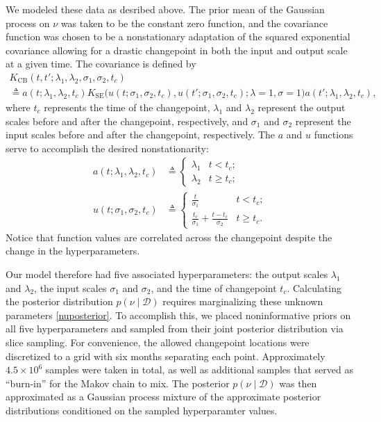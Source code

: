 \documentclass{article}
\newcommand{\deq}{\triangleq}
\newcommand{\cm}[1]{\mathcal{#1}}
\newcommand{\data}{\cm{D}}
\newcommand{\given}{\mid}
\begin{document}
We modeled these data as desribed above.  The prior mean of the
Gaussian process on $\nu$ was taken to be the constant zero function,
and the covariance function was chosen to be a nonstationary
adaptation of the squared exponential covariance allowing for a
drastic changepoint in both the input and output scale at a given
time.  The covariance is defined by
\begin{multline*}
  K_{\text{CB}}
  (t, t'; \lambda_1, \lambda_2, \sigma_1, \sigma_2, t_c)
  \\
  \deq
  a(t; \lambda_1, \lambda_2, t_c)
  K_{\text{SE}}
  \bigl(
    u(t; \sigma_1, \sigma_2, t_c),
    u(t'; \sigma_1, \sigma_2, t_c)
    ;
    \lambda = 1, \sigma = 1
  \bigr)
  a(t'; \lambda_1, \lambda_2, t_c),
\end{multline*}
where $t_c$ represents the time of the changepoint, $\lambda_1$ and
$\lambda_2$ represent the output scales before and after the
changepoint, respectively, and $\sigma_1$ and $\sigma_2$ represent the
input scales before and after the changepoint, respectively.  The $a$
and $u$ functions serve to accomplish the desired nonstationarity:
\begin{align*}\label{eq:ufundef}
  a(t; \lambda_1, \lambda_2, t_c) 
  &\deq
  \begin{cases}
    \lambda_1 & t < t_c; \\
    \lambda_2 & t \geq t_c;
  \end{cases}
  \\
  u(t; \sigma_1, \sigma_2, t_c) 
  &\deq
  \begin{cases}
    \frac{t}{\sigma_1} 
    & t < t_c; \\
    \frac{t_c}{\sigma_1} + \frac{t - t_c}{\sigma_2} 
    & t \geq t_c.
  \end{cases}
\end{align*}
Notice that function values are correlated across the changepoint
despite the change in the hyperparameters.

Our model therefore had five associated hyperparameters: the output
scales $\lambda_1$ and $\lambda_2$, the input scales $\sigma_1$ and
$\sigma_2$, and the time of changepoint $t_c$.  Calculating the
posterior distribution $p(\nu \given \data)$ requires marginalizing
these unknown parameters \eqref{nuposterior}.  To accomplish this, we
placed noninformative priors on all five hyperparameters and sampled
from their joint posterior distribution via slice sampling.  For
convenience, the allowed changepoint locations were discretized to a
grid with six months separating each point.  Approximately $4.5 \times
10^6$ samples were taken in total, as well as additional samples that
served as ``burn-in'' for the Makov chain to mix.  The posterior
$p(\nu \given \data)$ was then approximated as a Gaussian process
mixture of the approximate posterior distributions conditioned on the
sampled hyperparamter values.
\end{document}
